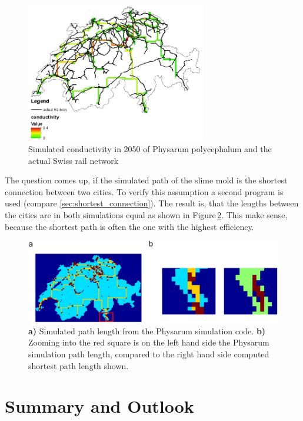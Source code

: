 \documentclass[11pt]{scrartcl}
\begin{document}
\begin{figure}[H]
	\centering
	\includegraphics[width=0.7\textwidth]{figures/conductivity_railway_2050}
	\caption{Simulated conductivity in 2050 of Physarum polycephalum and the actual Swiss rail network}
	\label{fig:conductivity_2050}
\end{figure}

The question comes up, if the simulated path of the slime mold is the shortest connection between two cities. To verify this assumption a second program is used (compare \ref{sec:shortest_connection}). The result is, that the lengths between the cities are in both simulations equal as shown in Figure\,\ref{fig:short}. This make sense, because the shortest path is often the one with the highest efficiency.

\begin{figure}[H]
	\centering
	\includegraphics[width=12cm]{figures/figure3}
	\caption{\textbf{a)} Simulated path length from the Physarum simulation code. \textbf{b)} Zooming into the red square is on the left hand side the Physarum simulation path length, compared to the right hand side computed shortest path length shown.}
	\label{fig:short}
\end{figure}
\label{sec:matlab}


\section{Summary and Outlook}
\label{sec:summary}
\end{document}

